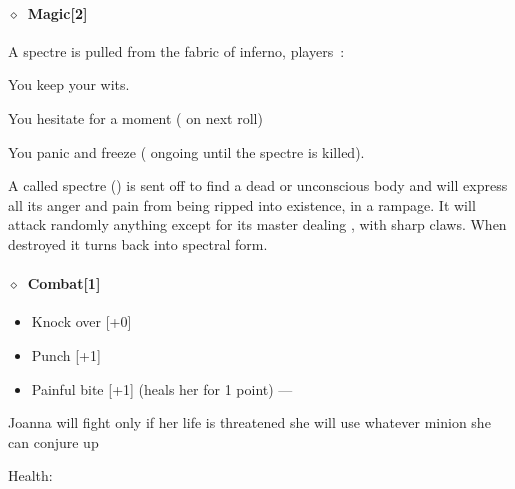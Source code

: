 \documentclass[bg-full]{resources/stylesheets/kult}
\begin{document}
\paragraph{\(\diamond\)~Magic[2]}%
\begin{description}[noitemsep]
  \item[Summon a Spectre] A spectre is pulled from the fabric of inferno, players~:
    \begin{description}[noitemsep]
      \item[(\KULTred{15+})] You keep your wits.
      \item[(\KULTred{10--14})] You hesitate for a moment ( on next roll)
      \item[(\KULTred{-9})] You panic and freeze ( ongoing until the spectre is killed).
    \end{description}
  \item[Manifest a Spectre] A called spectre () is sent off to find a dead or unconscious body and will
    express all its anger and pain from being ripped into existence, in a rampage.  It will attack randomly anything except for
    its master dealing , with sharp claws.  When destroyed it turns back into spectral form.
\end{description}
\paragraph{\(\diamond\)~Combat[1]}%
\begin{itemize}[noitemsep]
  \item Knock over [+0]
  \item Punch [+1]
  \item Painful bite [+1] (heals her for 1 point) --- 
\end{itemize}
Joanna will fight only if her life is threatened she will use whatever minion she can conjure up
\KULTrule%

Health:    
   
\end{document}
